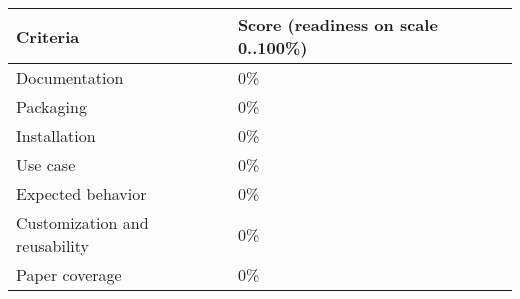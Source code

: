\documentclass{sigplanconf}
\begin{document}
\begin{tabular}{|p{1.0in}|p{1.8in}|}
 \hline

 \textbf{Criteria} & \textbf{Score (readiness on scale 0..100\%)} \\

 \hline
 Documentation & 0\% \\

 \hline
 Packaging & 0\% \\

 \hline
 Installation & 0\% \\

 \hline
 Use case & 0\% \\

 \hline
 Expected behavior & 0\% \\

 \hline
 Customization and reusability & 0\% \\

 \hline
 Paper coverage & 0\% \\

 \hline
\end{tabular}

\end{document}
